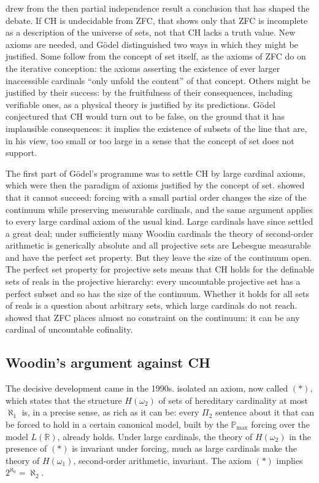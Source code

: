 \documentclass{situationist-preprint}
\begin{document}
\citet{Godel1947,Godel1964} drew from the then partial independence result a conclusion that has shaped the debate. If CH is undecidable from ZFC, that shows only that ZFC is incomplete as a description of the universe of sets, not that CH lacks a truth value. New axioms are needed, and Gödel distinguished two ways in which they might be justified. Some follow from the concept of set itself, as the axioms of ZFC do on the iterative conception: the axioms asserting the existence of ever larger inaccessible cardinals \enquote{only unfold the content} of that concept. Others might be justified by their success: by the fruitfulness of their consequences, including verifiable ones, as a physical theory is justified by its predictions. Gödel conjectured that CH would turn out to be false, on the ground that it has implausible consequences: it implies the existence of subsets of the line that are, in his view, too small or too large in a sense that the concept of set does not support.

The first part of Gödel's programme was to settle CH by large cardinal axioms, which were then the paradigm of axioms justified by the concept of set. \citet{LevySolovay1967} showed that it cannot succeed: forcing with a small partial order changes the size of the continuum while preserving measurable cardinals, and the same argument applies to every large cardinal axiom of the usual kind. Large cardinals have since settled a great deal; under sufficiently many Woodin cardinals the theory of second-order arithmetic is generically absolute and all projective sets are Lebesgue measurable and have the perfect set property. But they leave the size of the continuum open. The perfect set property for projective sets means that CH holds for the definable sets of reals in the projective hierarchy: every uncountable projective set has a perfect subset and so has the size of the continuum. Whether it holds for all sets of reals is a question about arbitrary sets, which large cardinals do not reach. \citet{Easton1970} showed that ZFC places almost no constraint on the continuum: it can be any cardinal of uncountable cofinality.

\subsection{Woodin's argument against CH}

The decisive development came in the 1990s. \citet{Woodin1999} isolated an axiom, now called $(*)$, which states that the structure $H(\omega_2)$ of sets of hereditary cardinality at most $\aleph_1$ is, in a precise sense, as rich as it can be: every $\Pi_2$ sentence about it that can be forced to hold in a certain canonical model, built by the $\mathbb{P}_{\max}$ forcing over the model $L(\mathbb{R})$, already holds. Under large cardinals, the theory of $H(\omega_2)$ in the presence of $(*)$ is invariant under forcing, much as large cardinals make the theory of $H(\omega_1)$, second-order arithmetic, invariant. The axiom $(*)$ implies $2^{\aleph_0} = \aleph_2$.
\end{document}
